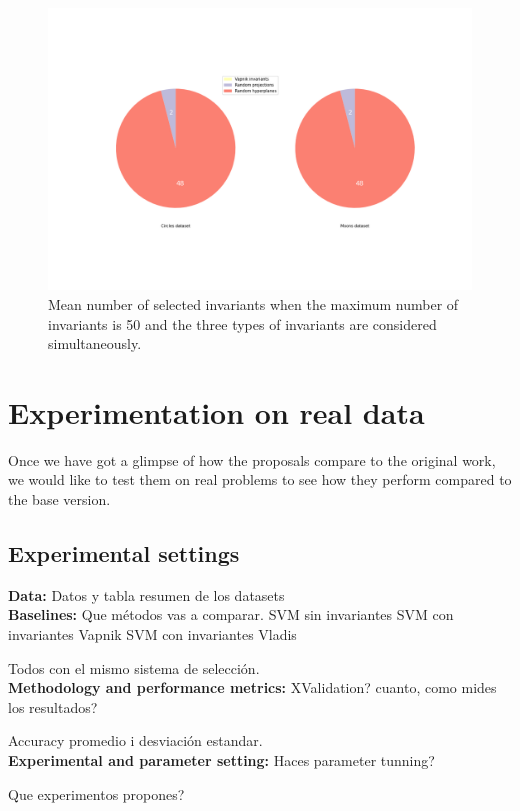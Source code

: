 \begin{figure}[H]
    \centering
    \includegraphics[width=\textwidth]{thesis/Figures/mean_num_selected.png}
    \caption{Mean number of selected invariants when the maximum number of invariants is 50 and the three types of
    invariants are considered simultaneously.}
    \label{fig:toys_mean_num_selected}
\end{figure}

\section{Experimentation on real data}

Once we have got a glimpse of how the proposals compare to the original work, we would like to test them
on real problems to see how they perform compared to the base version.

\subsection{Experimental settings}
{\bf Data:} Datos y tabla resumen de los datasets\\
{\bf Baselines:} Que métodos vas a comparar.
SVM sin invariantes
SVM con invariantes Vapnik
SVM con invariantes Vladis

Todos con el mismo sistema de selección.
\\
{\bf Methodology and performance metrics:} XValidation? cuanto, como mides los resultados?

Accuracy promedio i desviación estandar.
\\
{\bf Experimental and parameter setting:}
Haces parameter tunning?

Que experimentos propones?

